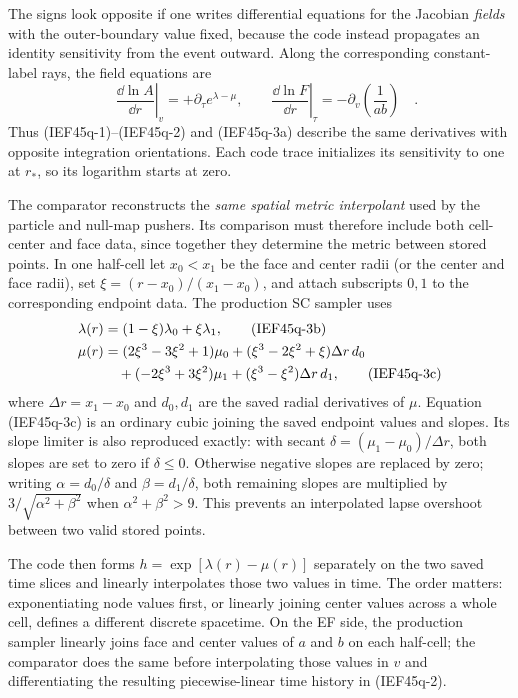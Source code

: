 The signs look opposite if one writes differential equations for the
Jacobian \emph{fields} with the outer-boundary value fixed, because the code
instead propagates an identity sensitivity from the event outward.  Along
the corresponding constant-label rays, the field equations are
\[
 \boxed{\quad
 \left.\frac{\dd\ln A}{\dd r}\right|_{v}
     =+\partial_\tau e^{\lambda-\mu},
 \qquad
 \left.\frac{\dd\ln F}{\dd r}\right|_{\tau}
     =-\partial_v\!\left(\frac1{ab}\right)
 \quad} .                                             \tag{IEF45q-3a}
\]
Thus (IEF45q-1)--(IEF45q-2) and (IEF45q-3a) describe the same derivatives
with opposite integration orientations.  Each code trace initializes its
sensitivity to one at \(r_*\), so its logarithm starts at zero.

The comparator reconstructs the \emph{same spatial metric interpolant} used
by the particle and null-map pushers.  Its comparison must therefore include
both cell-center and face data, since together they determine the metric
between stored points.  In one half-cell let \(x_0<x_1\)
be the face and center radii (or the center and face radii), set
\(\xi=(r-x_0)/(x_1-x_0)\), and attach subscripts \(0,1\) to the corresponding
endpoint data.  The production SC sampler uses
\begin{align}
 \lambda(r)&=(1-\xi)\lambda_0+\xi\lambda_1,             \tag{IEF45q-3b}\\
 \mu(r)&=(2\xi^3-3\xi^2+1)\mu_0
 +(\xi^3-2\xi^2+\xi)\Delta r\,d_0 \notag\\
 &\quad+(-2\xi^3+3\xi^2)\mu_1
 +(\xi^3-\xi^2)\Delta r\,d_1,                         \tag{IEF45q-3c}
\end{align}
where \(\Delta r=x_1-x_0\) and \(d_0,d_1\) are the saved radial derivatives
of \(\mu\).  Equation (IEF45q-3c) is an ordinary cubic joining the saved
endpoint values and slopes.  Its slope limiter is also reproduced exactly:
with secant \(\delta=(\mu_1-\mu_0)/\Delta r\), both slopes are set to zero if
\(\delta\leq0\).  Otherwise negative slopes are replaced by zero; writing
\(\alpha=d_0/\delta\) and \(\beta=d_1/\delta\), both remaining slopes are
multiplied by \(3/\sqrt{\alpha^2+\beta^2}\) when
\(\alpha^2+\beta^2>9\).  This prevents an interpolated lapse overshoot
between two valid stored points.

The code then forms
\(h=\exp[\lambda(r)-\mu(r)]\) separately on the two saved time slices and
linearly interpolates those two values in time.  The order matters:
exponentiating node values first, or linearly joining center values across a
whole cell, defines a different discrete spacetime.  On the EF side, the
production sampler linearly joins face and center values of \(a\) and \(b\)
on each half-cell; the comparator does the same before interpolating those
values in \(v\) and differentiating the resulting piecewise-linear time
history in (IEF45q-2).


